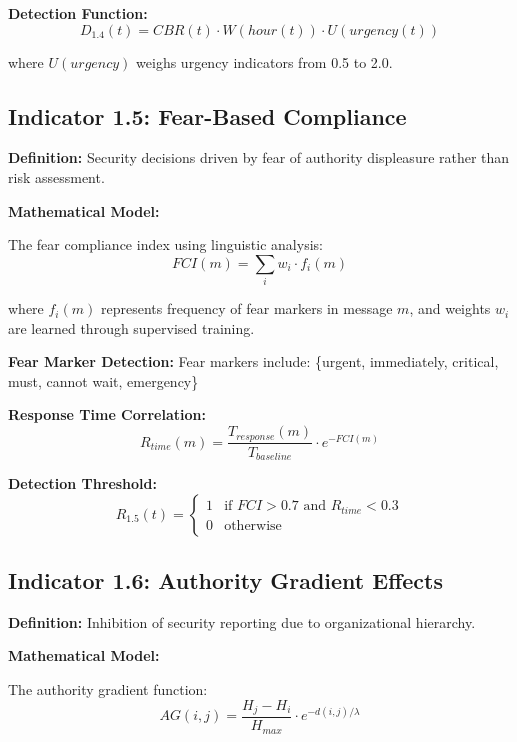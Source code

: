 \documentclass[11pt,a4paper]{article}
\begin{document}
\textbf{Detection Function:}
\begin{equation}
D_{1.4}(t) = CBR(t) \cdot W(hour(t)) \cdot U(urgency(t))
\end{equation}

where $U(urgency)$ weighs urgency indicators from 0.5 to 2.0.

\subsection{Indicator 1.5: Fear-Based Compliance}

\textbf{Definition:} Security decisions driven by fear of authority displeasure rather than risk assessment.

\textbf{Mathematical Model:}

The fear compliance index using linguistic analysis:
\begin{equation}
FCI(m) = \sum_{i} w_i \cdot f_i(m)
\end{equation}

where $f_i(m)$ represents frequency of fear markers in message $m$, and weights $w_i$ are learned through supervised training.

\textbf{Fear Marker Detection:}
Fear markers include: \{urgent, immediately, critical, must, cannot wait, emergency\}

\textbf{Response Time Correlation:}
\begin{equation}
R_{time}(m) = \frac{T_{response}(m)}{T_{baseline}} \cdot e^{-FCI(m)}
\end{equation}

\textbf{Detection Threshold:}
\begin{equation}
R_{1.5}(t) = \begin{cases}
1 & \text{if } FCI > 0.7 \text{ and } R_{time} < 0.3 \\
0 & \text{otherwise}
\end{cases}
\end{equation}

\subsection{Indicator 1.6: Authority Gradient Effects}

\textbf{Definition:} Inhibition of security reporting due to organizational hierarchy.

\textbf{Mathematical Model:}

The authority gradient function:
\begin{equation}
AG(i,j) = \frac{H_j - H_i}{H_{max}} \cdot e^{-d(i,j)/\lambda}
\end{equation}
\end{document}
